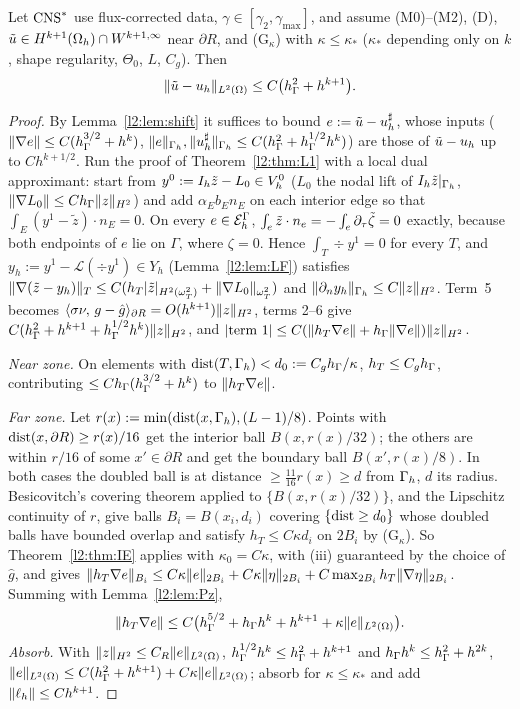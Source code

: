 \begin{theorem}\label{l2:thm:G}
Let $\mathrm{CNS}^\ast$ use flux-corrected data, $\gamma\in[\gamma_2,\gamma_{\max}]$, and assume (M0)--(M2), (D), $\tilde u\in H^{k+1}(\Omega_h)\cap W^{k+1,\infty}$ near $\partial R$, and (G$_\kappa$) with $\kappa\le\kappa_\ast$ ($\kappa_\ast$ depending only on $k$, shape regularity, $\Theta_0$, $L$, $C_g$). Then
\[
\lVert \tilde u-u_h\rVert_{L^2(\Omega)}\le C\bigl(h_\Gamma^2+h^{k+1}\bigr).
\]
\end{theorem}

\begin{proof}
By Lemma~\ref{l2:lem:shift} it suffices to bound $e:=\tilde u-u_h^\sharp$, whose inputs ($\lVert \nabla e\rVert\le C(h_\Gamma^{3/2}+h^k)$, $\lVert e\rVert_{\Gamma_h},\lVert u_h^\sharp\rVert_{\Gamma_h}\le C(h_\Gamma^2+h_\Gamma^{1/2}h^k)$) are those of $\tilde u-u_h$ up to $Ch^{k+1/2}$. Run the proof of Theorem~\ref{l2:thm:L1} with a local dual approximant: start from $y^0:=I_h\tilde z-L_0\in V_h^0$ ($L_0$ the nodal lift of $I_h\tilde z|_{\Gamma_h}$, $\lVert \nabla L_0\rVert\le Ch_\Gamma\lVert z\rVert_{H^2}$) and add $\alpha_Eb_En_E$ on each interior edge so that $\int_E(y^1-\tilde z)\cdot n_E=0$. On every $e\in\mathcal E_h^\Gamma$, $\int_e\tilde z\cdot n_e=-\int_e\partial_\tau\tilde\zeta=0$ exactly, because both endpoints of $e$ lie on $\Gamma$, where $\zeta=0$. Hence $\int_T\div y^1=0$ for every $T$, and $y_h:=y^1-\mathcal L(\div y^1)\in Y_h$ (Lemma~\ref{l2:lem:LF}) satisfies $\lVert \nabla(\tilde z-y_h)\rVert_T\le C(h_T|\tilde z|_{H^2(\omega^2_T)}+\lVert \nabla L_0\rVert_{\omega^2_T})$ and $\lVert \partial_n y_h\rVert_{\Gamma_h}\le C\lVert z\rVert_{H^2}$. Term~5 becomes $\langle \sigma\nu,\, g-\hat g\rangle_{\partial R}=O(h^{k+1})\lVert z\rVert_{H^2}$, terms 2--6 give $C(h_\Gamma^2+h^{k+1}+h_\Gamma^{1/2}h^k)\lVert z\rVert_{H^2}$, and $|\text{term }1|\le C(\lVert h_T\nabla e\rVert+h_\Gamma\lVert \nabla e\rVert)\lVert z\rVert_{H^2}$.

\emph{Near zone.} On elements with $\operatorname{dist}(T,\Gamma_h)<d_0:=C_gh_\Gamma/\kappa$, $h_T\le C_gh_\Gamma$, contributing $\le Ch_\Gamma(h_\Gamma^{3/2}+h^k)$ to $\lVert h_T\nabla e\rVert$.

\emph{Far zone.} Let $r(x):=\min(\operatorname{dist}(x,\Gamma_h),(L-1)/8)$. Points with $\operatorname{dist}(x,\partial R)\ge r(x)/16$ get the interior ball $B(x,r(x)/32)$; the others are within $r/16$ of some $x'\in\partial R$ and get the boundary ball $B(x',r(x)/8)$. In both cases the doubled ball is at distance $\ge\frac{11}{16}r(x)\ge d$ from $\Gamma_h$, $d$ its radius. Besicovitch's covering theorem applied to $\{B(x,r(x)/32)\}$, and the Lipschitz continuity of $r$, give balls $B_i=B(x_i,d_i)$ covering $\{\operatorname{dist}\ge d_0\}$ whose doubled balls have bounded overlap and satisfy $h_T\le C\kappa d_i$ on $2B_i$ by (G$_\kappa$). So Theorem~\ref{l2:thm:IE} applies with $\kappa_0=C\kappa$, with (iii) guaranteed by the choice of $\hat g$, and gives $\lVert h_T\nabla e\rVert_{B_i}\le C\kappa\lVert e\rVert_{2B_i}+C\kappa\lVert \eta\rVert_{2B_i}+C\max_{2B_i}h_T\lVert \nabla\eta\rVert_{2B_i}$. Summing with Lemma~\ref{l2:lem:Pz},
\[
\lVert h_T\nabla e\rVert\le C\bigl(h_\Gamma^{5/2}+h_\Gamma h^k+h^{k+1}+\kappa\lVert e\rVert_{L^2(\Omega)}\bigr).
\]
\emph{Absorb.} With $\lVert z\rVert_{H^2}\le C_R\lVert e\rVert_{L^2(\Omega)}$, $h_\Gamma^{1/2}h^k\le h_\Gamma^2+h^{k+1}$ and $h_\Gamma h^k\le h_\Gamma^2+h^{2k}$, $\lVert e\rVert_{L^2(\Omega)}\le C(h_\Gamma^2+h^{k+1})+C\kappa\lVert e\rVert_{L^2(\Omega)}$; absorb for $\kappa\le\kappa_\ast$ and add $\lVert \ell_h\rVert\le Ch^{k+1}$.
\end{proof}

